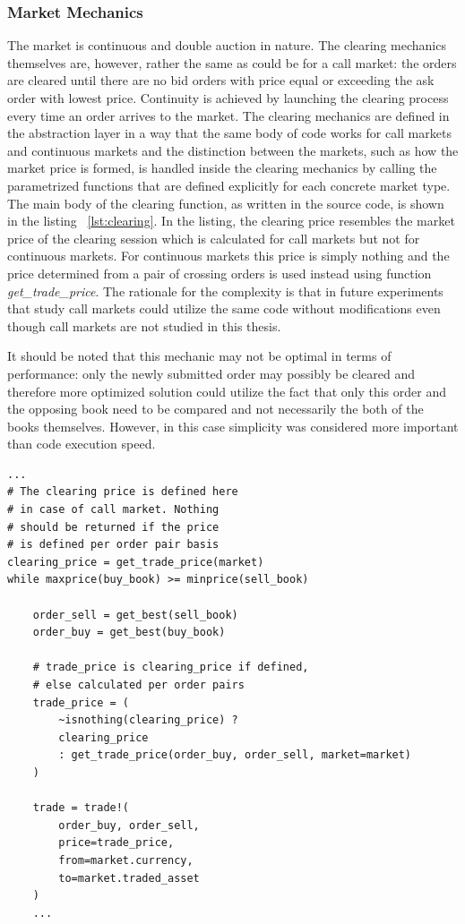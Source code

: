 \subsubsection{Market Mechanics}

The market is continuous and double auction in nature.
The clearing mechanics themselves are, however, 
rather the same as could be for a call market: 
the orders are cleared until there
are no bid orders with price equal or exceeding the
ask order with lowest price. 
Continuity is achieved by launching the clearing process
every time an order arrives to the market. 
The clearing mechanics are defined in 
the abstraction layer in a way that the same body
of code works for call markets and continuous markets
and the distinction between the markets, such as how 
the market price is formed, is handled inside the clearing
mechanics by calling the parametrized functions that are 
defined explicitly for each concrete market type. 
The main body of the clearing function, 
as written in the source code, is shown in the listing ~\ref{lst:clearing}.
In the listing, the clearing price resembles the market price
of the clearing session which is calculated for call markets but not for 
continuous markets. For continuous markets this price is simply nothing and
the price determined from a pair of crossing orders is used instead using function
\emph{get\_trade\_price}. The rationale for the complexity is that in future experiments
that study call markets could utilize the same code without modifications 
even though call markets are not studied in this thesis.

It should be noted that this mechanic may not be optimal in terms of performance: 
only the newly submitted order may possibly be cleared and therefore more 
optimized solution could utilize the fact that only this order and the opposing book
need to be compared and not necessarily the both of the books themselves. However,
in this case simplicity was considered more important than code execution speed.


\begin{lstlisting}[caption={Clearing process},label={lst:clearing}]
...
# The clearing price is defined here
# in case of call market. Nothing
# should be returned if the price
# is defined per order pair basis
clearing_price = get_trade_price(market)
while maxprice(buy_book) >= minprice(sell_book)

    order_sell = get_best(sell_book)
    order_buy = get_best(buy_book)
    
    # trade_price is clearing_price if defined,
    # else calculated per order pairs
    trade_price = (
        ~isnothing(clearing_price) ? 
        clearing_price
        : get_trade_price(order_buy, order_sell, market=market)
    )

    trade = trade!(
        order_buy, order_sell, 
        price=trade_price, 
        from=market.currency, 
        to=market.traded_asset
    )
    ...
\end{lstlisting}

